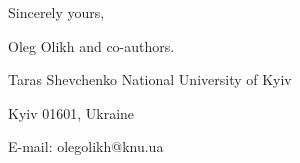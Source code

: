 \documentclass[preprint]{elsarticle}
\begin{document}
%


\vspace{3mm}

Sincerely yours,

Oleg Olikh and co-authors.


Taras Shevchenko National University of Kyiv


Kyiv 01601, Ukraine

E-mail: olegolikh@knu.ua


\end{document}
